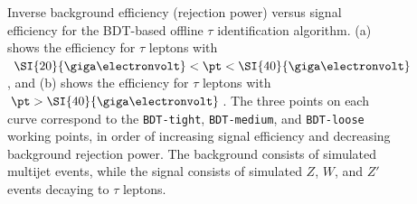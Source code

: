 \begin{figure}[htbp]
	\centering
	\hfill
	\caption{Inverse background efficiency (rejection power) versus signal efficiency for the BDT-based offline $\tau$ identification algorithm. (a) shows the efficiency for $\tau$ leptons with $\SI{20}{\giga\electronvolt}<\pt<\SI{40}{\giga\electronvolt}$, and (b) shows the efficiency for $\tau$ leptons with $\pt>\SI{40}{\giga\electronvolt}$. The three points on each curve correspond to the \texttt{BDT-tight}, \texttt{BDT-medium}, and \texttt{BDT-loose} working points, in order of increasing signal efficiency and decreasing background rejection power. The background consists of simulated multijet events, while the signal consists of simulated $Z$, $W$, and $Z'$ events decaying to $\tau$ leptons. }
	\label{fig:reco-tau-efficiency}
\end{figure}


